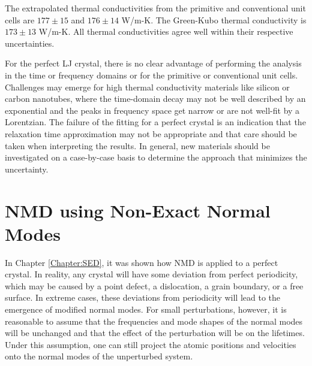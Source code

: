 
The extrapolated thermal conductivities from the primitive and 
conventional unit cells are $177 \pm 15$ and $176 \pm 14$ W/m-K. 
The Green-Kubo thermal conductivity is $173 \pm 13$ W/m-K. All thermal 
conductivities agree well within their respective uncertainties.

For the perfect LJ crystal, there is no clear advantage of performing 
the analysis in the time or frequency domains or for the primitive or 
conventional unit cells. Challenges may emerge for high thermal 
conductivity materials like silicon or carbon nanotubes, where the 
time-domain decay may not be well described by an exponential and the 
peaks in frequency space get narrow or are not well-fit by a Lorentzian. 
The failure of the fitting for a perfect crystal is an indication that 
the relaxation time approximation may not be appropriate and that care 
should be taken when interpreting the results. In general, new materials 
should be investigated on a case-by-case basis to determine the approach 
that minimizes the uncertainty.

\section{\label{A:NMD XCORR}NMD using Non-Exact Normal Modes}

In Chapter \ref{Chapter:SED}, it was shown how NMD is 
applied to a perfect crystal. In reality, any crystal will have some 
deviation from perfect periodicity, which may be caused by a point defect, 
a dislocation, a grain boundary, or a free surface. In extreme cases, 
these deviations from periodicity will lead to the emergence of modified 
normal modes. For small perturbations, however, it is reasonable to
assume that the frequencies and mode shapes of the normal modes will 
be unchanged and that the effect of the perturbation will be on the 
lifetimes. Under this assumption, one can still project the atomic 
positions and velocities onto the normal modes of the unperturbed system.

